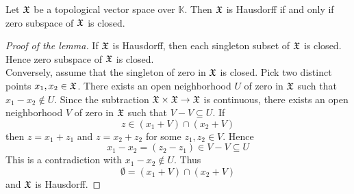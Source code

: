 \begin{lemma}\label{lemma:Hausdorff_topological_vector_spaces}
   Let ${\mathfrak X}$ be a topological vector space over $\mathbb{K}$. Then ${\mathfrak X}$ is Hausdorff if and only if zero subspace of ${\mathfrak X}$ is closed.
\end{lemma}
\begin{proof}[Proof of the lemma]
   If ${\mathfrak X}$ is Hausdorff, then each singleton subset of ${\mathfrak X}$ is closed. Hence zero subspace of ${\mathfrak X}$ is closed.\\
   Conversely, assume that the singleton of zero in ${\mathfrak X}$ is closed. Pick two distinct points $x_1,x_2 \in {\mathfrak X}$. There exists an open neighborhood $U$ of zero in ${\mathfrak X}$ such that $x_1 - x_2\not \in U$. Since the subtraction ${\mathfrak X}\times {\mathfrak X}\rightarrow {\mathfrak X}$ is continuous, there exists an open neighborhood $V$ of zero in ${\mathfrak X}$ such that $V - V\subseteq U$. If
   $$z \in (x_1 + V)\cap (x_2 + V)$$
   then $z = x_1 + z_1$ and $z = x_2 + z_2$ for some $z_1,z_2 \in V$. Hence
   $$x_1 - x_2 = (z_2 - z_1) \in V - V \subseteq U$$
   This is a contradiction with $x_1 - x_2 \not \in U$. Thus
   $$\emptyset = (x_1 + V)\cap (x_2 + V)$$
   and ${\mathfrak X}$ is Hausdorff.
\end{proof}

